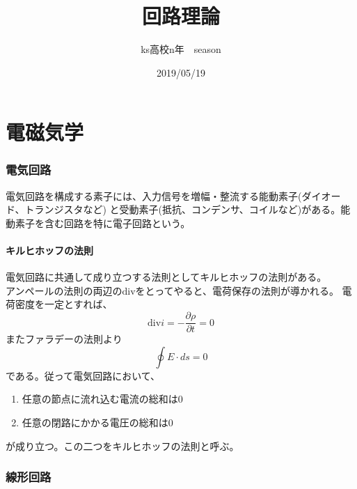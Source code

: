 \documentclass{jsarticle}
\begin{document}
\title{回路理論}
\author{ks高校n年　season}
\date{2019/05/19}
\maketitle
\newcommand{\repart}[1]{\part{#1}\setcounter{section}{0}}
\newcommand{\lr}[1]{\left(#1 \right)}
\newcommand{\mlr}[1]{\left\{#1 \right\}}
\newcommand{\llr}[1]{\left[#1 \right]}
\newcommand{\vlr}[1]{\left|#1 \right|}%
\newcommand{\rec}[1]{\frac{1}{#1}}
\newcommand{\de}[2][]{\frac{d #1}{d #2}}
\newcommand{\pd}[2][]{\frac{\partial #1}{\partial #2}}
\newcommand{\ppd}[3]{\frac{\partial^2 #1}{\partial #2\partial #3}}
\newcommand{\pmat}[1]{\begin{pmatrix} #1 \end{pmatrix}}
\newcommand{\lp}{\mathcal{L}}
\newcommand{\grad}{\mathrm{grad}}
\newcommand{\dive}{\mathrm{div}}
\newcommand{\rot}{\mathrm{rot}}
\newcommand{\pa}{\partial}
\newcommand{\na}{\nabla}
\repart{電磁気学}
    \section{電気回路}
        電気回路を構成する素子には、入力信号を増幅・整流する能動素子(ダイオード、トランジスタなど)
        と受動素子(抵抗、コンデンサ、コイルなど)がある。能動素子を含む回路を特に電子回路という。
        \subsection{キルヒホッフの法則}
            電気回路に共通して成り立つする法則としてキルヒホッフの法則がある。\\
            アンペールの法則の両辺の$\dive$をとってやると、電荷保存の法則が導かれる。
            電荷密度を一定とすれば、
                \[\dive i = -\pd[\rho]{t} = 0\]
            またファラデーの法則より
                \[\oint E\cdot ds = 0\]
            である。従って電気回路において、
            \begin{enumerate}
                \item 任意の節点に流れ込む電流の総和は0
                \item 任意の閉路にかかる電圧の総和は0
            \end{enumerate}
            が成り立つ。この二つをキルヒホッフの法則と呼ぶ。
    \section{線形回路}
\end{document}
